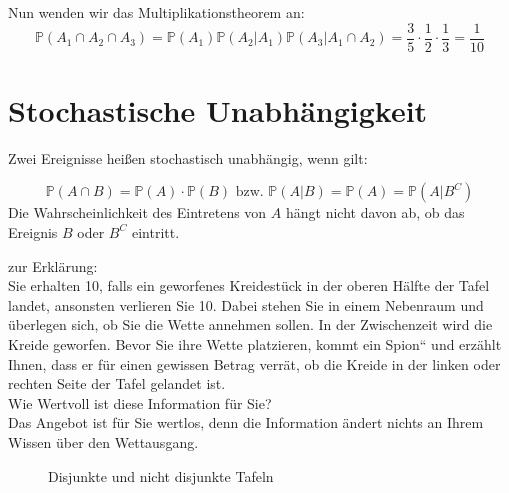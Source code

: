 {\begin{bsp}
    Nun wenden wir das Multiplikationstheorem an:
    \[
    \mathbb P\left(A_{1}\cap A_{2}\cap A_{3}\right)=
    \mathbb P\left(A_{1}\right)\mathbb P\left(A_{2}|A_{1}\right)\mathbb P\left(A_{3}|A_{1}\cap A_{2}\right)=
    \frac{3}{5}\cdot \frac{1}{2}\cdot \frac{1}{3}=\frac{1}{10}
    \]

    \end{bsp}

    
    \section{Stochastische Unabhängigkeit}

    Zwei Ereignisse heißen stochastisch unabhängig, wenn gilt:

    \[
        \mathbb P\left(A\cap B\right)=
        \mathbb P\left(A\right)\cdot \mathbb P\left(B\right)\text{ bzw. }
        \mathbb P\left(A|B\right)=\mathbb P\left(A\right)=\mathbb P\left(A|B^{C}\right)
    \]
    Die Wahrscheinlichkeit des Eintretens von $A$ hängt nicht davon ab, ob das Ereignis $B$ oder $B^C$ eintritt.

    \begin{bsp} zur Erklärung: \\
        Sie erhalten 10{\texteuro}, falls
        ein geworfenes Kreidestück in der oberen Hälfte der Tafel landet,
        ansonsten verlieren Sie 10{\texteuro}. Dabei stehen Sie in einem
        Nebenraum und überlegen sich, ob Sie die Wette annehmen sollen. In der
        Zwischenzeit wird die Kreide geworfen. Bevor Sie ihre Wette platzieren,
        kommt ein {\quotedblbase}Spion{\textquotedblleft} und erzählt Ihnen,
        dass er für einen gewissen Betrag verrät, ob die Kreide in der linken
        oder rechten Seite der Tafel gelandet ist.\\

        Wie Wertvoll ist diese Information für Sie?\\

        Das Angebot ist für Sie wertlos, denn die Information ändert nichts an Ihrem
        Wissen über den Wettausgang.
    \end{bsp}

    \begin{figure}
    \centering
    \caption{Disjunkte und nicht disjunkte Tafeln}
    \label{fig:tafeln}
    \end{figure}

}
